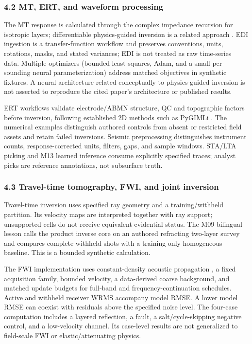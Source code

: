 \subsubsection{4.2 MT, ERT, and waveform
processing}\label{mt-ert-and-waveform-processing}

The MT response is calculated through the complex impedance recursion
for isotropic layers; differentiable physics-guided inversion is a
related approach \cite{goyes2025}. EDI ingestion is a transfer-function
workflow and preserves conventions, units, rotations, masks, and stated
variances; EDI is not treated as raw time-series data. Multiple
optimizers (bounded least squares, Adam, and a small per-sounding neural
parameterization) address matched objectives in synthetic fixtures. A
neural architecture related conceptually to physics-guided inversion
\cite{goyes2025} is not asserted to reproduce the cited paper's
architecture or published results.

ERT workflows validate electrode/ABMN structure, QC and topographic
factors before inversion, following established 2D methods such as
PyGIMLi \cite{pygimli}. The numerical examples distinguish authored
controls from absent or restricted field assets and retain failed
inversions. Seismic preprocessing distinguishes instrument counts,
response-corrected units, filters, gaps, and sample windows. STA/LTA
picking and M13 learned inference consume explicitly specified traces;
analyst picks are reference annotations, not subsurface truth.

\subsubsection{4.3 Travel-time tomography, FWI, and joint
inversion}\label{travel-time-tomography-fwi-and-joint-inversion}

Travel-time inversion uses specified ray geometry and a
training/withheld partition. Its velocity maps are interpreted together
with ray support; unsupported cells do not receive equivalent evidential
status. The M09 bilingual lesson calls the product inverse core on an
authored refracting two-layer survey and compares complete withheld
shots with a training-only homogeneous baseline. This is a bounded
synthetic calculation.

The FWI implementation uses constant-density acoustic propagation
\cite{virieux2009,deepwave}, a fixed acquisition family, bounded
velocity, a data-derived coarse background, and matched update budgets
for full-band and frequency-continuation schedules. Active and withheld
receiver WRMS accompany model RMSE. A lower model RMSE can coexist with
residuals above the specified noise level. The four-case computation
includes a layered reflection, a fault, a salt/cycle-skipping negative
control, and a low-velocity channel. Its case-level results are not
generalized to field-scale FWI or elastic/attenuating physics.

